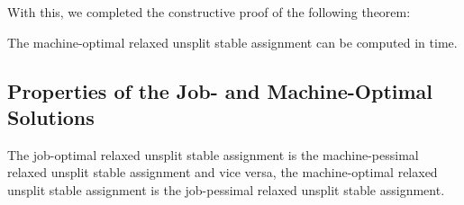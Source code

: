 \documentclass{llncs}
\begin{document}
With this, we completed the constructive proof of the following theorem:

\begin{theorem}
\label{m_opt}
The machine-optimal relaxed unsplit stable assignment
 can be computed in  time.
\end{theorem}

\subsection{Properties of the Job- and Machine-Optimal Solutions}

\begin{theorem}
\label{th:opt_pess}
The job-optimal relaxed unsplit stable assignment  is
the machine-pessimal relaxed unsplit stable assignment and vice versa,
the machine-optimal relaxed unsplit stable assignment
 is the job-pessimal relaxed unsplit stable
assignment.
\end{theorem}
\end{document}
